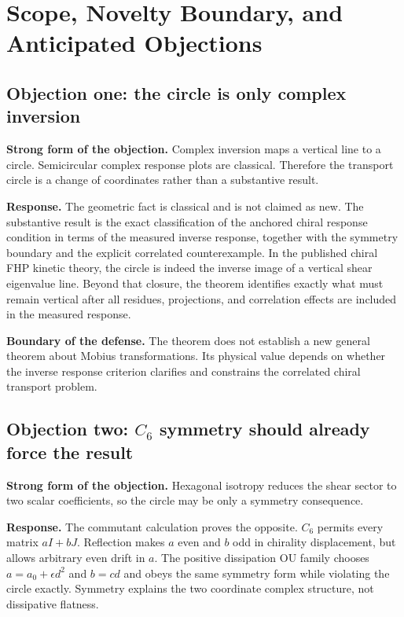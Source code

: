 \chapter{Scope, Novelty Boundary, and Anticipated Objections}\label{app:adversarial}

\section{Objection one: the circle is only complex inversion}
\textbf{Strong form of the objection.} Complex inversion maps a vertical line to a circle. Semicircular complex response plots are classical. Therefore the transport circle is a change of coordinates rather than a substantive result.

\textbf{Response.} The geometric fact is classical and is not claimed as new. The substantive result is the exact classification of the anchored chiral response condition in terms of the measured inverse response, together with the symmetry boundary and the explicit correlated counterexample. In the published chiral FHP kinetic theory, the circle is indeed the inverse image of a vertical shear eigenvalue line. Beyond that closure, the theorem identifies exactly what must remain vertical after all residues, projections, and correlation effects are included in the measured response.

\textbf{Boundary of the defense.} The theorem does not establish a new general theorem about Mobius transformations. Its physical value depends on whether the inverse response criterion clarifies and constrains the correlated chiral transport problem.

\section{Objection two: $C_6$ symmetry should already force the result}
\textbf{Strong form of the objection.} Hexagonal isotropy reduces the shear sector to two scalar coefficients, so the circle may be only a symmetry consequence.

\textbf{Response.} The commutant calculation proves the opposite. $C_6$ permits every matrix $aI+bJ$. Reflection makes $a$ even and $b$ odd in chirality displacement, but allows arbitrary even drift in $a$. The positive dissipation OU family chooses $a=a_0+\epsilon d^2$ and $b=cd$ and obeys the same symmetry form while violating the circle exactly. Symmetry explains the two coordinate complex structure, not dissipative flatness.

